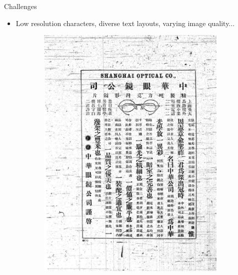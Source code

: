 \documentclass{beamer}
\begin{document}
\begin{frame}
    \begin{center}
        \Large{Challenges}
    \end{center}
    \begin{itemize}
        \item Low resolution characters, diverse text layouts, varying image quality...
    \end{itemize}
    \begin{figure}[htbp]
        \centering
        \begin{subfigure}[b]{0.23\linewidth}
            \includegraphics[height=1.3\linewidth]{./figures/fnzz1}
        \end{subfigure}
        \hfill
        \begin{subfigure}[b]{0.23\linewidth}

\end{subfigure}
\end{figure}
\end{frame}
\end{document}
